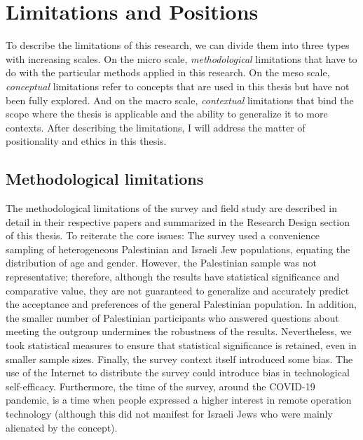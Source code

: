 \documentclass[dissertation,math,vertlayout,pdfa,colorlinks,nologo]{aaltoseries}
\begin{document}
\section{Limitations and Positions}
To describe the limitations of this research, we can divide them into three types with increasing scales. On the micro scale, \textit{methodological} limitations that have to do with the particular methods applied in this research. On the meso scale, \textit{conceptual} limitations refer to concepts that are used in this thesis but have not been fully explored. And on the macro scale, \textit{contextual} limitations that bind the scope where the thesis is applicable and the ability to generalize it to more contexts. After describing the limitations, I will address the matter of positionality and ethics in this thesis.

\subsection{Methodological limitations}
The methodological limitations of the survey and field study are described in detail in their respective papers and summarized in the Research Design section of this thesis. To reiterate the core issues: The survey used a convenience sampling of heterogeneous Palestinian and Israeli Jew populations, equating the distribution of age and gender. However, the Palestinian sample was not representative; therefore, although the results have statistical significance and comparative value, they are not guaranteed to generalize and accurately predict the acceptance and preferences of the general Palestinian population. In addition, the smaller number of Palestinian participants who answered questions about meeting the outgroup undermines the robustness of the results. Nevertheless, we took statistical measures to ensure that statistical significance is retained, even in smaller sample sizes. Finally, the survey context itself introduced some bias. The use of the Internet to distribute the survey could introduce bias in technological self-efficacy. Furthermore, the time of the survey, around the COVID-19 pandemic, is a time when people expressed a higher interest in remote operation technology (although this did not manifest for Israeli Jews who were mainly alienated by the concept).
\end{document}
